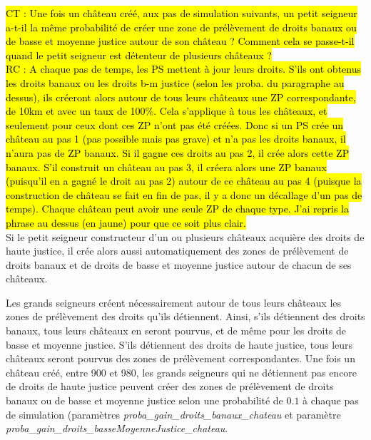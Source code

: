 \documentclass[a4paper,11pt]{article}
\newcommand{\hlc}[2][yellow]{ {\sethlcolor{#1} \hl{#2}} }
\begin{document}
{%
\hlc[fluorescentorange]{CT : Une fois un château créé, aux pas de simulation suivants, un petit seigneur a-t-il la même probabilité de créer une zone de prélèvement de droits banaux ou de basse et moyenne justice autour de son château ? Comment cela se passe-t-il quand le petit seigneur est détenteur de plusieurs châteaux ?\\
RC : A chaque pas de temps, les PS mettent à jour leurs droits. S'ils ont obtenus les droits banaux ou  les droits b-m justice (selon les proba. du paragraphe au dessus), ils créeront alors autour de tous leurs châteaux une ZP correspondante, de 10km et avec un taux de 100\%. Cela s'applique à tous les châteaux, et seulement pour ceux dont ces ZP n'ont pas été créées.
Donc si un PS crée un château au pas 1 (pas possible mais pas grave) et n'a pas les droits banaux, il n'aura pas de ZP banaux. Si il gagne ces droits au pas 2, il crée alors cette ZP banaux. S'il construit un château au pas 3, il créera alors une ZP banaux (puisqu'il en a gagné le droit au pas 2) autour de ce château au pas 4 (puisque la construction de château se fait en fin de pas, il y a donc un décallage d'un pas de temps). Chaque château peut avoir une seule ZP de chaque type.
J'ai repris la phrase au dessus (en jaune) pour que ce soit plus clair.
}\\

Si le petit seigneur constructeur d'un ou plusieurs châteaux acquière des droits de haute justice, il crée alors aussi automatiquement des zones de prélèvement de droits banaux et de droits de basse et moyenne justice autour de chacun de ses châteaux.

\begin{sloppypar} %
Les grands seigneurs créent nécessairement autour de tous leurs châteaux les zones de prélèvement des droits qu'ils détiennent. Ainsi, s'ils détiennent des droits banaux, tous leurs châteaux en seront pourvus, et de même pour les droits de basse et moyenne justice. S'ils détiennent des droits de haute justice, tous leurs châteaux seront pourvus des zones de prélèvement correspondantes. Une fois un château créé, entre 900 et 980, les grands seigneurs qui ne détiennent pas encore de droits de haute justice peuvent créer des zones de prélèvement de droits banaux ou de basse et moyenne justice selon une probabilité de $0.1$ à chaque pas de simulation (paramètres \textit{proba\_gain\_droits\_banaux\_chateau} et paramètre \textit{proba\_gain\_droits\_basseMoyenneJustice\_chateau}.\\
\end{sloppypar}	

}
\end{document}
